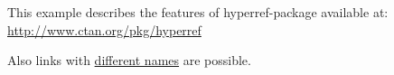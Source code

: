 This example describes the features of hyperref-package available at:\\\url{http://www.ctan.org/pkg/hyperref}

Also links with \href{http://ftp.gwdg.de/pub/ctan/macros/latex/contrib/hyperref/doc/manual.html#x1-140004}{different names} are possible.
